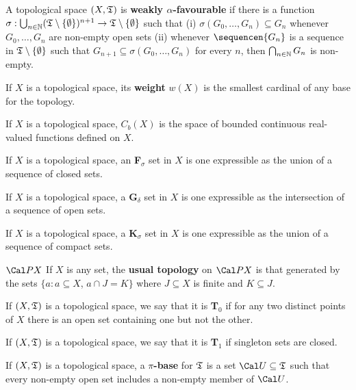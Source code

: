  A topological space $(X,\frak T)$ is
{\bf weakly $\alpha$-favourable} if there is a function
$\sigma:\bigcup_{n\in\Bbb N}(\frak T\setminus\{\emptyset\})^{n+1}
\to\frak T\setminus\{\emptyset\}$ such that (i)
$\sigma(G_0,\ldots,G_n)\subseteq G_n$ whenever $G_0,\ldots,G_n$ are
non-empty open sets (ii) whenever
$\sequencen{G_n}$ is a sequence in $\frak T\setminus\{\emptyset\}$ such
that $G_{n+1}\subseteq\sigma(G_0,\ldots,G_n)$ for every $n$, then
$\bigcap_{n\in\Bbb N}G_n$ is non-empty.

 If $X$ is a topological space, its {\bf weight} $w(X)$
is the smallest cardinal of any base for the topology.

 If $X$ is a topological space, $C_b(X)$ is the space of
bounded continuous real-valued functions defined on $X$.

 If $X$ is a topological space, an {\bf
F$_{\sigma}$}
set in $X$ is one expressible as the union of a sequence of closed sets.

 If $X$ is a topological space, a {\bf
G$_{\delta}$}
set in $X$ is one expressible as the intersection of a
sequence of open sets.

 If $X$ is a topological space, a
{\bf K$_{\sigma}$} set in $X$ is one expressible as the union of a
sequence of compact sets.


$\Cal PX$ If $X$ is any set, the {\bf usual topology} on $\Cal PX$ is
that generated by the sets $\{a:a\subseteq X$, $a\cap J=K\}$ where
$J\subseteq X$ is finite and $K\subseteq J$.

 If $(X,\frak T)$ is a topological space, we say that it
is
{\bf T$_0$} if for any two distinct points of $X$ there is an open set
containing one but not the other.

 If $(X,\frak T)$ is a topological space, we say that it
is
{\bf T$_1$} if singleton sets are closed.

 If $(X,\frak T)$ is a topological space, a
{\bf $\pi$-base} for $\frak T$ is a set $\Cal U\subseteq\frak T$ such
that every non-empty open set includes a non-empty member of $\Cal U$.


